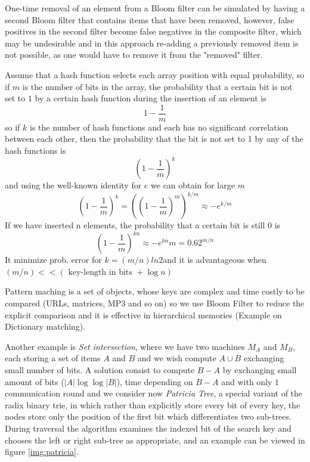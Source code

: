 One-time removal of an element from a Bloom filter can be simulated by having a second Bloom filter that contains items that have been removed, however, false positives
in the second filter become false negatives in the composite filter, which may be undesirable and in this approach re-adding a previously removed item is not possible,
as one would have to remove it from the "removed" filter.

Assume that a hash function selects each array position with equal probability, so if $m$ is the number of bits in the array, the probability that a certain bit
is not set to $1$ by a certain hash function during the insertion of an element is
\[ 1 - \frac{1}{m} \]
so if $k$ is the number of hash functions and each has no significant correlation between each other, then the probability that the bit is not set to 1 by any of the hash functions is
\[ (1 - \frac{1}{m})^k \]
and using the well-known identity for $e$ we can obtain for large $m$
\[ (1 - \frac{1}{m})^k = ((1 - \frac{1}{m})^m)^{k/m} \approx -e^{k/m} \]
If we have inserted n elements, the probability that a certain bit is still $0$ is 
\[ (1 - \frac{1}{m})^{kn} \approx -e^{kn}{m} = 0.62^{m/n}\]
It minimize prob. error for $k = (m/n) ln 2$and it is advantageous when $(m/n) << (\text{ key-length in bits } + \log n)$

Pattern maching is a set of objects, whose keys are complex and time costly to be compared (URLs, matrices, MP3 and so on) so we use Bloom Filter to
reduce the explicit comparison and it is effective in hierarchical memories (Example on Dictionary matching).

Another example is \emph{Set intersection}, where we have two machines $M_A$ and $M_B$, each storing a set of items $A$ and $B$ and we wish compute $A \cup B$
exchanging small number of bits.\newline
A solution consist to compute $B - A$ by exchanging small amount of bits ($|A| \log \log |B|$), time depending on $B - A$ and with only $1$ communication round and we consider now
\emph{Patricia Tree}, a special variant of the radix binary trie, in which rather than explicitly store every bit of every key, the nodes store only the position of the first bit
which differentiates two sub-trees.\newline
During traversal the algorithm examines the indexed bit of the search key and chooses the left or right sub-tree as appropriate, and an example can be viewed in figure \ref{img:patricia}.

